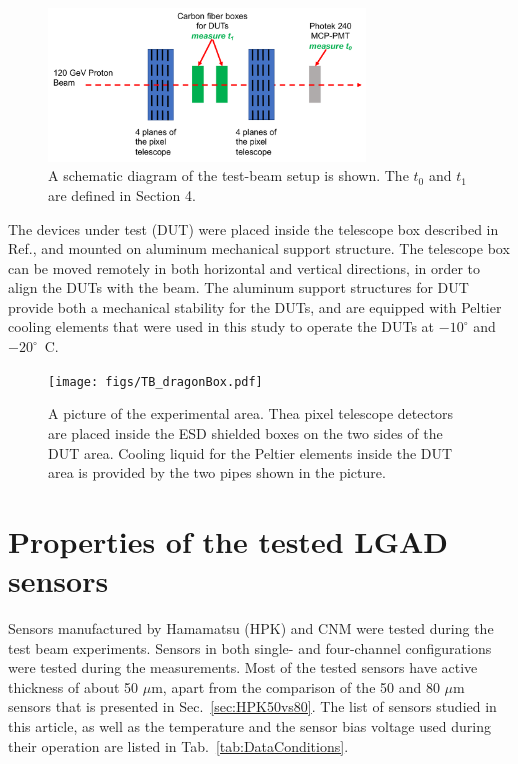 \documentclass[preprint,1p]{elsarticle}
\begin{document}
\begin{figure}[htbp] 
\centering
\includegraphics[width=0.75\textwidth]{figs/BeamSetup.pdf} 
\caption{A schematic diagram of the test-beam setup is shown. The $t_0$ and $t_1$ are defined in Section 4.} 
\label{fig:DragonBoxDiagram} 
\end{figure} 

The devices under test (DUT) were placed inside the telescope box described in
Ref.\cite{KWAN2016162}, and mounted on aluminum mechanical support structure.
The telescope box can be moved remotely in both horizontal and vertical
directions, in order to align the DUTs with the beam. The aluminum support
structures for DUT provide both a mechanical stability for the DUTs, and are
equipped with Peltier cooling elements that were used in this study to operate
the DUTs at $-10^{\circ}$ and $-20^{\circ}$~C.

\begin{figure}[htbp] 
\centering
\texttt{[image: figs/TB\_dragonBox.pdf]} 
\caption{A picture of the experimental area. Thea pixel telescope detectors are placed inside the ESD shielded boxes on the two sides of the DUT area. Cooling liquid for the Peltier elements inside the DUT area is provided by the two pipes shown in the picture.} 
\label{fig:DragonBox} 
\end{figure} 


\section{Properties of the tested LGAD sensors}
\label{sec:sensors}

Sensors manufactured by Hamamatsu (HPK) and CNM were tested during the test beam
experiments. Sensors in both single- and four-channel configurations were tested
during the measurements. Most of the tested sensors have active thickness of
about 50 $\mu$m, apart from the comparison of the 50 and 80 $\mu$m sensors that
is presented in Sec.~\ref{sec:HPK50vs80}. The list of sensors studied in this
article, as well as the temperature and the sensor bias voltage used during
their operation are listed in Tab.~\ref{tab:DataConditions}. 
\end{document}
